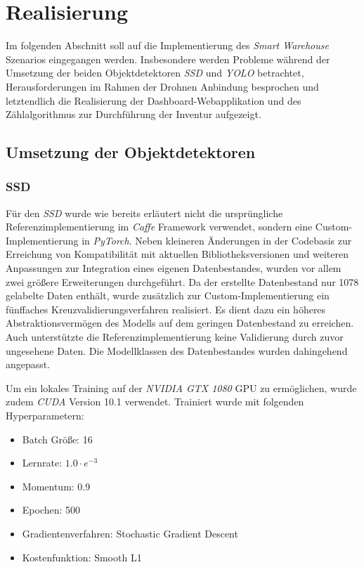 \chapter{Realisierung}

Im folgenden Abschnitt soll auf die Implementierung des \textit{Smart Warehouse} Szenarios eingegangen werden. Insbesondere werden Probleme während der Umsetzung der beiden Objektdetektoren \textit{SSD} und \textit{YOLO} betrachtet, Herausforderungen im Rahmen der Drohnen Anbindung besprochen und letztendlich die Realisierung der Dashboard-Webapplikation und des Zählalgorithmus zur Durchführung der Inventur aufgezeigt. 

\section{Umsetzung der Objektdetektoren}

\subsection*{SSD}

Für den \textit{SSD} wurde wie bereits erläutert nicht die ursprüngliche Referenzimplementierung im \textit{Caffe} Framework verwendet, sondern eine Custom-Implementierung in \textit{PyTorch}. Neben kleineren Änderungen in der Codebasis zur Erreichung von Kompatibilität mit aktuellen Bibliotheksversionen und weiteren Anpassungen zur Integration eines eigenen Datenbestandes, wurden vor allem zwei größere Erweiterungen durchgeführt. Da der erstellte Datenbestand nur 1078 gelabelte Daten enthält, wurde zusätzlich zur Custom-Implementierung ein fünffaches Kreuzvalidierungsverfahren realisiert. Es dient dazu ein höheres Abstraktionsvermögen des Modells auf dem geringen Datenbestand zu erreichen. Auch unterstützte die Referenzimplementierung keine Validierung durch zuvor ungesehene Daten. Die Modellklassen des Datenbestandes wurden dahingehend angepasst.

Um ein lokales Training auf der \textit{NVIDIA GTX 1080} GPU zu ermöglichen, wurde zudem \textit{CUDA} Version 10.1 verwendet. Trainiert wurde mit folgenden Hyperparametern:
\begin{itemize}
	\item Batch Größe: 16
	\item Lernrate: $1.0\cdot e^{-3}$
	\item Momentum: 0.9
	\item Epochen: 500
	\item Gradientenverfahren: Stochastic Gradient Descent
	\item Kostenfunktion: Smooth L1
\end{itemize}

